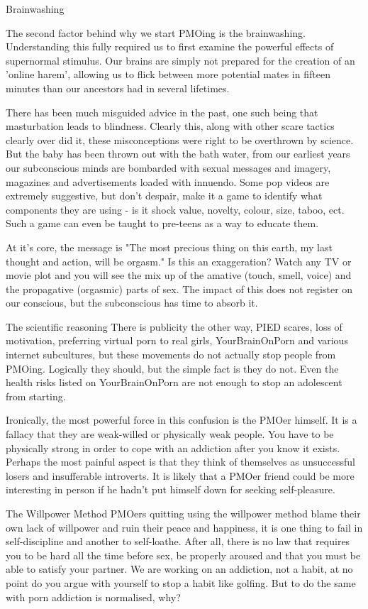 Brainwashing

The second factor behind why we start PMOing is the brainwashing. Understanding this fully required us to first examine the powerful effects of supernormal stimulus. Our brains are simply not prepared for the creation of an 'online harem', allowing us to flick between more potential mates in fifteen minutes than our ancestors had in several lifetimes.

There has been much misguided advice in the past, one such being that masturbation leads to blindness. Clearly this, along with other scare tactics clearly over did it, these misconceptions were right to be overthrown by science. But the baby has been thrown out with the bath water, from our earliest years our subconscious minds are bombarded with sexual messages and imagery, magazines and advertisements loaded with innuendo. Some pop videos are extremely suggestive, but don't despair, make it a game to identify what components they are using - is it shock value, novelty, colour, size, taboo, ect. Such a game can even be taught to pre-teens as a way to educate them.

At it's core, the message is "The most precious thing on this earth, my last thought and action, will be orgasm." Is this an exaggeration? Watch any TV or movie plot and you will see the mix up of the amative (touch, smell, voice) and the propagative (orgasmic) parts of sex. The impact of this does not register on our conscious, but the subconscious has time to absorb it.

The scientific reasoning
There is publicity the other way, PIED scares, loss of motivation, preferring virtual porn to real girls, YourBrainOnPorn and various internet subcultures, but these movements do not actually stop people from PMOing. Logically they should, but the simple fact is they do not. Even the health risks listed on YourBrainOnPorn are not enough to stop an adolescent from starting.

Ironically, the most powerful force in this confusion is the PMOer himself. It is a fallacy that they are weak-willed or physically weak people. You have to be physically strong in order to cope with an addiction after you know it exists. Perhaps the most painful aspect is that they think of themselves as unsuccessful losers and insufferable introverts. It is likely that a PMOer friend could be more interesting in person if he hadn't put himself down for seeking self-pleasure.

The Willpower Method
PMOers quitting using the willpower method blame their own lack of willpower and ruin their peace and happiness, it is one thing to fail in self-discipline and another to self-loathe. After all, there is no law that requires you to be hard all the time before sex, be properly aroused and that you must be able to satisfy your partner. We are working on an addiction, not a habit, at no point do you argue with yourself to stop a habit like golfing. But to do the same with porn addiction is normalised, why?

